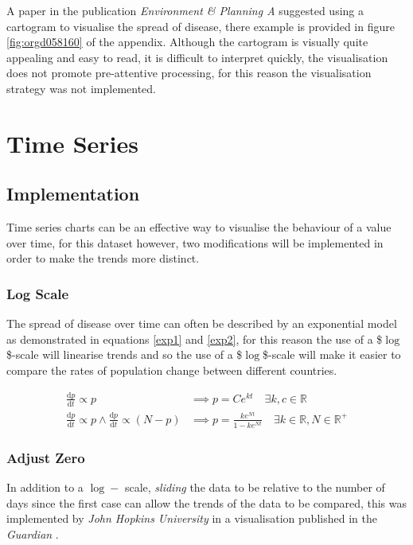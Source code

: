 \documentclass[11pt]{article}
\begin{document}
A paper in the publication \emph{Environment \& Planning A} suggested using a
cartogram to visualise the spread of disease, there example is provided in
figure \ref{fig:orgd058160} of the appendix. \cite{gao2020} Although the cartogram is visually
quite appealing and easy to read, it is difficult to interpret quickly, the
visualisation does not promote pre-attentive processing, for this reason the
visualisation strategy was not implemented.

\section{Time Series}
\label{sec:org7b8838c}
\subsection{Implementation}
\label{sec:org28b5403}
Time series charts can be an effective way to visualise the behaviour of a value
over time, for this dataset however, two modifications will be implemented in
order to make the trends more distinct.

\subsubsection{Log Scale}
\label{sec:org9371c0f}
The spread of disease over time can often be described by an exponential model as
demonstrated in equations \eqref{exp1} and \eqref{exp2}, for this reason the use of
a \$\(\log\)\$-scale will linearise trends and so the use of a \$\(\log\)\$-scale will make
it easier to compare the rates of population change between different countries.



\begin{align}
  \frac{\mathrm{d} p}{\mathrm{d} t} \propto p &\implies p = Ce^{kt} \quad \exists k,c \in \mathbb{R} \label{exp1} \\
  \frac{\mathrm{d} p}{\mathrm{d} t} \propto p \wedge    \frac{\mathrm{d} p}{\mathrm{d} t} \propto (N-p) &\implies p = \frac{ke^{Nt}}{1-ke^{Nt}} \quad \exists k \in \mathbb{R}, N \in \mathbb{R^+} \label{exp1} \label{exp2}
\end{align}

\subsubsection{Adjust Zero}
\label{sec:orga62083c}
In addition to a \(\log-\) scale, \emph{sliding} the data to be relative to the number
of days since the first case can allow the trends of the data to be compared,
this was implemented by \emph{John Hopkins University} in a visualisation published
in the \emph{Guardian} \cite{gutierrez2020}. \label{orgaa3f855}
\end{document}
